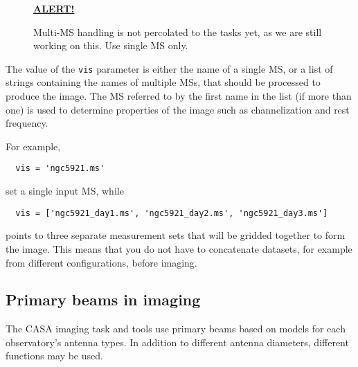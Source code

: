 \begin{wrapfigure}{r}{2.5in}
  \begin{boxedminipage}{2.5in}
     \centerline{\underline{\bf ALERT!}}
     Multi-MS handling is not percolated to the tasks yet, as
     we are still working on this.  Use single MS only.
  \end{boxedminipage}
\end{wrapfigure}

The value of the {\tt vis} parameter is either the name of a single
MS, or a list of strings containing the names of multiple MSs, that
should be processed to produce the image.  The MS referred to by the
first name in the list (if more than one) is used to determine
properties of the image such as channelization and rest frequency.

For example,
\small
\begin{verbatim}
  vis = 'ngc5921.ms'
\end{verbatim}
\normalsize
set a single input MS, while
\small
\begin{verbatim}
  vis = ['ngc5921_day1.ms', 'ngc5921_day2.ms', 'ngc5921_day3.ms']
\end{verbatim}
\normalsize
points to three separate measurement sets that will be gridded
together to form the image.  This means that you do not have
to concatenate datasets, for example from different configurations,
before imaging.

\subsection{Primary beams in imaging }
\label{section:im.pars.pb}

The CASA imaging task and tools use primary beams based on models
for each observatory's antenna types.  In addition to different 
antenna diameters, different functions may be used.  

